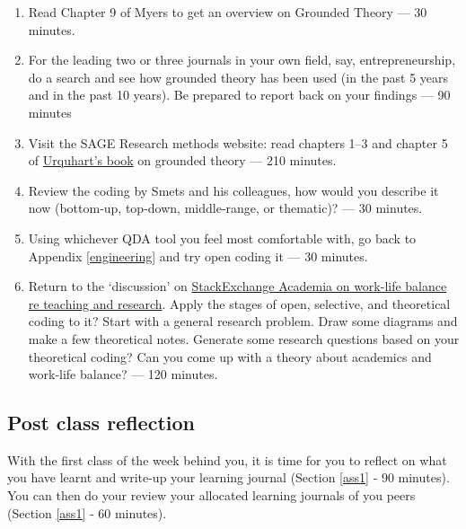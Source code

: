 \documentclass[]{book}
\theoremstyle{definition}
\theoremstyle{definition}
\theoremstyle{definition}
\theoremstyle{remark}
\begin{document}
\begin{enumerate}
\def\labelenumi{\arabic{enumi}.}
\item
  Read Chapter 9 of Myers \autocite*[
  p.~209--220]{myers_2013_qualitativeresearchbusiness} to get an
  overview on Grounded Theory --- 30 minutes.
\item
  For the leading two or three journals in your own field, say,
  entrepreneurship, do a search and see how grounded theory has been
  used (in the past 5 years and in the past 10 years). Be prepared to
  report back on your findings --- 90 minutes
\item
  Visit the SAGE Research methods website: read chapters 1--3 and
  chapter 5 of
  \href{\%5Bhttp://methods.sagepub.com/book/grounded-theory-for-qualitative-research}{Urquhart's
  book} \autocite{urquhart_2017_groundedtheoryqualitative} on grounded
  theory --- 210 minutes.
\item
  Review the coding by Smets and his colleagues, how would you describe
  it now (bottom-up, top-down, middle-range, or thematic)? --- 30
  minutes.
\item
  Using whichever QDA tool you feel most comfortable with, go back to
  Appendix \ref{engineering} and try open coding it --- 30 minutes.
\item
  Return to the `discussion' on
  \href{https://academia.stackexchange.com/questions/89362/how-do-academics-with-teaching-responsibilities-etc-find-the-time-to-do-resear}{StackExchange
  Academia on work-life balance re teaching and research}. Apply the
  stages of open, selective, and theoretical coding to it? Start with a
  general research problem. Draw some diagrams and make a few
  theoretical notes. Generate some research questions based on your
  theoretical coding? Can you come up with a theory about academics and
  work-life balance? --- 120 minutes.
\end{enumerate}

\hypertarget{post-class-reflection-8}{%
\subsection{Post class reflection}\label{post-class-reflection-8}}

With the first class of the week behind you, it is time for you to
reflect on what you have learnt and write-up your learning journal
(Section \ref{ass1} ‐ 90 minutes). You can then do your review your
allocated learning journals of you peers (Section \ref{ass1} ‐ 60
minutes).
\end{document}
